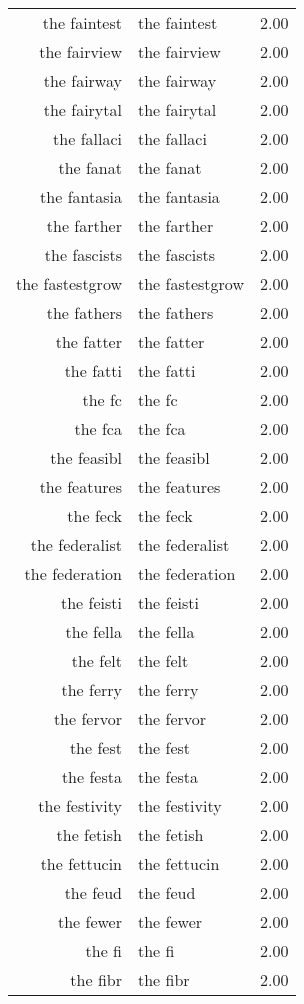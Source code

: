 \begin{table}[ht]
\begin{tabular}{rlr}
  the faintest & the faintest & 2.00 \\ 
  the fairview & the fairview & 2.00 \\ 
  the fairway & the fairway & 2.00 \\ 
  the fairytal & the fairytal & 2.00 \\ 
  the fallaci & the fallaci & 2.00 \\ 
  the fanat & the fanat & 2.00 \\ 
  the fantasia & the fantasia & 2.00 \\ 
  the farther & the farther & 2.00 \\ 
  the fascists & the fascists & 2.00 \\ 
  the fastestgrow & the fastestgrow & 2.00 \\ 
  the fathers & the fathers & 2.00 \\ 
  the fatter & the fatter & 2.00 \\ 
  the fatti & the fatti & 2.00 \\ 
  the fc & the fc & 2.00 \\ 
  the fca & the fca & 2.00 \\ 
  the feasibl & the feasibl & 2.00 \\ 
  the features & the features & 2.00 \\ 
  the feck & the feck & 2.00 \\ 
  the federalist & the federalist & 2.00 \\ 
  the federation & the federation & 2.00 \\ 
  the feisti & the feisti & 2.00 \\ 
  the fella & the fella & 2.00 \\ 
  the felt & the felt & 2.00 \\ 
  the ferry & the ferry & 2.00 \\ 
  the fervor & the fervor & 2.00 \\ 
  the fest & the fest & 2.00 \\ 
  the festa & the festa & 2.00 \\ 
  the festivity & the festivity & 2.00 \\ 
  the fetish & the fetish & 2.00 \\ 
  the fettucin & the fettucin & 2.00 \\ 
  the feud & the feud & 2.00 \\ 
  the fewer & the fewer & 2.00 \\ 
  the fi & the fi & 2.00 \\ 
  the fibr & the fibr & 2.00 \\ 

\end{tabular}
\end{table}

